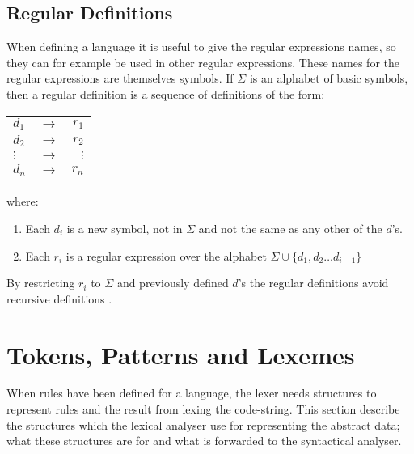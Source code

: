 \subsection{Regular Definitions}
When defining a language it is useful to give the regular expressions names, 
so they can for example be used in other regular expressions. These names for
the regular expressions are themselves symbols. If $\Sigma$ is an alphabet of 
basic symbols, then a regular definition is a sequence of definitions of the form:
\begin{center}
\begin{tabular}{l c r}
$d_1$ & $\to$ & $r_1$\\
$d_2$ & $\to$ & $r_2$\\
$\vdots$ & $\to$ & $\vdots$\\
$d_n$ & $\to$ & $r_n$\\

\end{tabular}
\end{center}
where:
\begin{enumerate}
\item Each $d_i$ is a new symbol, not in $\Sigma$ and not the same as any other 
of the $d$'s.
\item Each $r_i$ is a regular expression over the alphabet $\Sigma  \cup \{d_1, 
d_2 \dots d_{i-1}\}$
\end{enumerate}
By restricting $r_i$ to $\Sigma$ and previously defined $d$'s the regular 
definitions avoid recursive definitions \cite{Aho2006}.

\section{Tokens, Patterns and Lexemes}
When rules have been defined for a language, the lexer needs structures to
represent rules and the result from lexing the code-string. 
This section describe the structures which the lexical analyser use
for representing the abstract data; what these structures are for and what is 
forwarded to the syntactical analyser. 

